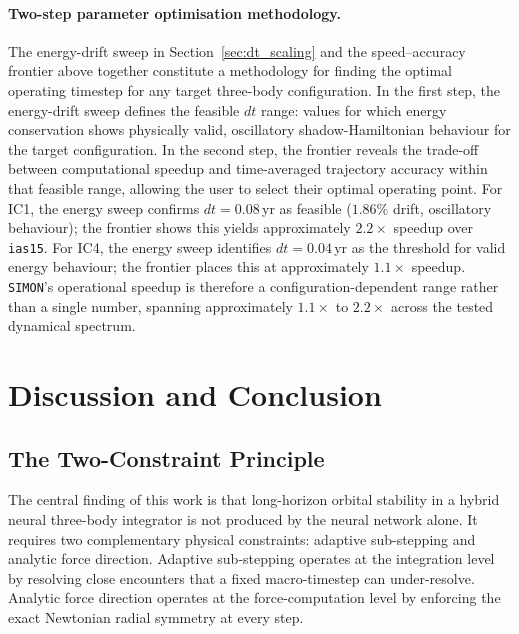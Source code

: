 \documentclass[12pt]{article}
\begin{document}
\paragraph{Two-step parameter optimisation methodology.}
The energy-drift sweep in Section~\ref{sec:dt_scaling} and the
speed--accuracy frontier above together constitute a methodology for
finding the optimal operating timestep for any target three-body
configuration. In the first step, the energy-drift sweep defines the
feasible $dt$ range: values for which energy conservation shows
physically valid, oscillatory shadow-Hamiltonian behaviour for the
target configuration. In the second step, the frontier reveals the
trade-off between computational speedup and time-averaged trajectory
accuracy within that feasible range, allowing the user to select their
optimal operating point. For IC1, the energy sweep confirms
$dt=0.08$\,yr as feasible ($1.86\%$ drift, oscillatory behaviour); the
frontier shows this yields approximately $\mathbf{2.2\times}$ speedup
over \texttt{ias15}. For IC4, the energy sweep identifies
$dt=0.04$\,yr as the threshold for valid energy behaviour; the frontier
places this at approximately $\mathbf{1.1\times}$ speedup.
\texttt{SIMON}'s operational speedup is therefore a
configuration-dependent range rather than a single number,
spanning approximately $\mathbf{1.1\times}$ to $\mathbf{2.2\times}$
across the tested dynamical spectrum.



\section{Discussion and Conclusion}
\label{sec:discussion}

\subsection{The Two-Constraint Principle}

The central finding of this work is that long-horizon orbital stability in a hybrid
neural three-body integrator is not produced by the neural network alone. It requires
two complementary physical constraints: adaptive sub-stepping and analytic force
direction. Adaptive sub-stepping operates at the integration level by resolving close
encounters that a fixed macro-timestep can under-resolve. Analytic force direction
operates at the force-computation level by enforcing the exact Newtonian radial
symmetry at every step.
\end{document}
